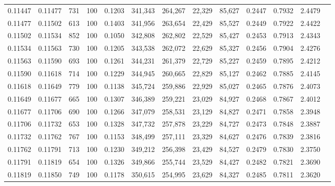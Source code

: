 \begin{tabular}{rrrrrrrrrrrrr}
0.11447 & 0.11477 &   731 & 100 &                                     0.1203 & 341,343 & 264,267 &  22,329 &  85,627 & 0.2447 & 0.7932 & 2.4479 \\
0.11477 & 0.11502 &   613 & 100 &                                     0.1403 & 341,956 & 263,654 &  22,429 &  85,527 & 0.2449 & 0.7922 & 2.4422 \\
0.11502 & 0.11534 &   852 & 100 &                                     0.1050 & 342,808 & 262,802 &  22,529 &  85,427 & 0.2453 & 0.7913 & 2.4343 \\
0.11534 & 0.11563 &   730 & 100 &                                     0.1205 & 343,538 & 262,072 &  22,629 &  85,327 & 0.2456 & 0.7904 & 2.4276 \\
0.11563 & 0.11590 &   693 & 100 &                                     0.1261 & 344,231 & 261,379 &  22,729 &  85,227 & 0.2459 & 0.7895 & 2.4212 \\
0.11590 & 0.11618 &   714 & 100 &                                     0.1229 & 344,945 & 260,665 &  22,829 &  85,127 & 0.2462 & 0.7885 & 2.4145 \\
0.11618 & 0.11649 &   779 & 100 &                                     0.1138 & 345,724 & 259,886 &  22,929 &  85,027 & 0.2465 & 0.7876 & 2.4073 \\
0.11649 & 0.11677 &   665 & 100 &                                     0.1307 & 346,389 & 259,221 &  23,029 &  84,927 & 0.2468 & 0.7867 & 2.4012 \\
0.11677 & 0.11706 &   690 & 100 &                                     0.1266 & 347,079 & 258,531 &  23,129 &  84,827 & 0.2471 & 0.7858 & 2.3948 \\
0.11706 & 0.11732 &   653 & 100 &                                     0.1328 & 347,732 & 257,878 &  23,229 &  84,727 & 0.2473 & 0.7848 & 2.3887 \\
0.11732 & 0.11762 &   767 & 100 &                                     0.1153 & 348,499 & 257,111 &  23,329 &  84,627 & 0.2476 & 0.7839 & 2.3816 \\
0.11762 & 0.11791 &   713 & 100 &                                     0.1230 & 349,212 & 256,398 &  23,429 &  84,527 & 0.2479 & 0.7830 & 2.3750 \\
0.11791 & 0.11819 &   654 & 100 &                                     0.1326 & 349,866 & 255,744 &  23,529 &  84,427 & 0.2482 & 0.7821 & 2.3690 \\
0.11819 & 0.11850 &   749 & 100 &                                     0.1178 & 350,615 & 254,995 &  23,629 &  84,327 & 0.2485 & 0.7811 & 2.3620 \\

\end{tabular}
